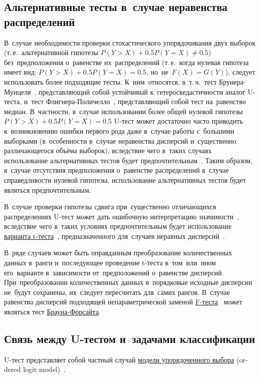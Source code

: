 \documentclass[]{scrreprt}
\begin{document}
\subsection{Альтернативные тесты в~случае неравенства распределений}
В~случае необходимости проверки стохастического упорядочивания двух выборок (т.\,е.~альтернативной гипотезы $P(Y>X)+0.5P(Y=X)\neq0.5$) без~предположения о~равенстве их~распределений (т.\,е.~когда нулевая гипотеза имеет вид: $P(Y>X)+0.5P(Y=X)=0.5$, но~не~$F(X)=G(Y)$), следует использовать более подходящие тесты. К~ним~относятся, в~т.\,ч.~тест Брунера-Мунцеля~\cite{Bruner-Munzel-test-1}, представляющий собой устойчивый к~гетероскедастичности аналог U-теста, и~тест Флигнера-Поличелло~\cite{Fligner-Policello-test}, представляющий собой тест на~равенство медиан. В~частности, в~случае использовании более общей нулевой гипотезы $P(Y>X)+0.5P(Y=X)=0.5$ U-тест может достаточно часто приводить к~возникновению ошибки первого рода даже в~случае работы с~большими выборками (в~особенности в~случае неравенства дисперсий и~существенно различающегося объёма выборок), вследствие чего в~таких случаях использование альтернативных тестов будет предпочтительным~\cite{U-test-vs-Bruner-Munzel-test}. Таким образом, в~случае отсутствия предположения о~равенстве распределений в~случае справедливости нулевой гипотезы, использование альтернативных тестов будет являться предпочтительным.

В~случае проверки гипотезы сдвига при~существенно отличающихся распределениях U-тест может дать ошибочную интерпретацию значимости~\cite{U-test-unequal-variance}, вследствие чего в~таких условиях предпочтительным будет использование \href{https://en.wikipedia.org/wiki/Welch's_t-test}{варианта t-теста}~\cite{Welch-t-test}, предназначенного для~случаев неравных дисперсий~\cite{U-test-unequal-variance}.

В~ряде случаев может быть оправданным преобразование количественных данных в~ранги и~последующее проведение t-теста в~том~или~ином его~варианте в~зависимости от~предположений о~равенстве дисперсий. При~преобразовании количественных данных в~порядковые исходные дисперсии не~будут сохранены, их~следует пересчитать для~самих рангов. В~случае равенства дисперсий подходящей непараметрической заменой \href{https://en.wikipedia.org/wiki/F-test}{F-теста}~\cite{F-test} может являться тест \href{https://en.wikipedia.org/wiki/Brown-Forsythe_test}{Брауна-Форсайта}.
%
\subsection{Связь между U-тестом и~задачами классификации}\label{U-test&classification}
U-тест представляет собой частный случай \href{https://en.wikipedia.org/wiki/Ordered_logit}{модели упорядоченного выбора} (\foreignlanguage{english}{ordered logit model})~\cite{Ordered-logit}.
%
\end{document}
